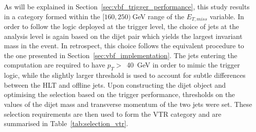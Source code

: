 \hspace{10pt} As will be explained in Section~\ref{sec:vbf_trigger_performance}, this study results in a category formed within the $[160,250)~$GeV range of the $E_{T, miss}$ variable. In order to follow the logic deployed at the trigger level, the choice of jets at the analysis level is again based on the dijet pair which yields the largest invariant mass in the event. In retrospect, this choice follows the equivalent procedure to the one presented in Section~\ref{sec:vbf_implementation}. The jets entering the computation are required to have $p_T>$~40~GeV in order to mimic the trigger logic, while the slightly larger threshold is used to account for subtle differences between the HLT and offline jets. Upon constructing the dijet object and optimising the selection based on the trigger performance, thresholds on the values of the dijet mass and transverse momentum of the two jets were set. These selection requirements are then used to form the VTR category and are summarised in Table~\ref{tab:selection_vtr}.


